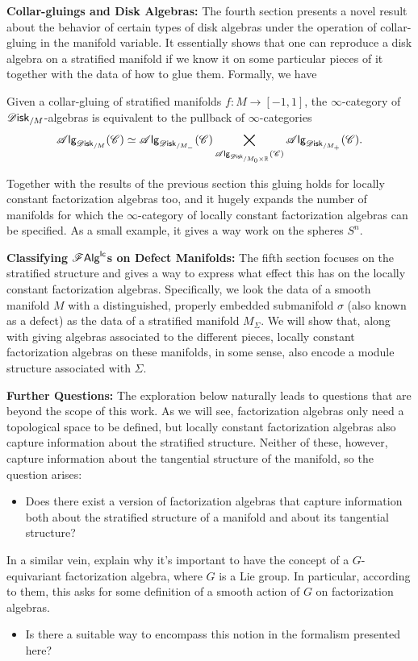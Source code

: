 \documentclass[../text]{subfiles}
\begin{document}
\textbf{ Collar-gluings and Disk Algebras:} The fourth section presents a novel result about the behavior of certain types of disk algebras under the operation of collar-gluing in the manifold variable. It essentially shows that one can reproduce a disk algebra on a stratified manifold if we know it on some particular pieces of it together with the data of how to glue them. Formally, we have
%
\begin{theorem}
    Given a collar-gluing of stratified manifolds $f: M \rightarrow [-1,1]$, the $\infty$-category of $\disk_{/M}$-algebras is equivalent to the pullback of $\infty$-categories
    \begin{equation}
        \alg{\disk_{/M}} (\catC) \simeq \alg{\disk_{/M_-}} (\catC) \bigtimes_{\alg{\disk_{/M_0 \times \mathbb{R}}} (\catC)} \alg{\disk_{/M_+}} (\catC).
    \end{equation}
\end{theorem}
%
Together with the results of the previous section this gluing holds for locally constant factorization algebras too, and it hugely expands the number of manifolds for which the $\infty$-category of locally constant factorization algebras can be specified. As a small example, it gives a way work on the spheres $S^n$.

\textbf{ Classifying $\mathscr{F} \mathsf{Alg}^{\mathsf{lc}}$s on Defect Manifolds:} The fifth section focuses on the stratified structure and gives a way to express what effect this has on the locally constant factorization algebras. Specifically, we look the data of a smooth manifold $M$ with a distinguished, properly embedded submanifold $\sigma$ (also known as a defect) as the data of a stratified manifold $M_\Sigma$. We will show that, along with giving algebras associated to the different pieces, locally constant factorization algebras on these manifolds, in some sense, also encode a module structure associated with $\Sigma$.

\textbf{Further Questions:} The exploration below naturally leads to questions that are beyond the scope of this work. As we will see, factorization algebras only need a topological space to be defined, but locally constant factorization algebras also capture information about the stratified structure. Neither of these, however, capture information about the tangential structure of the manifold, so the question arises:
%
\begin{itemize}
    \item Does there exist a version of factorization algebras that capture information both about the stratified structure of a manifold and about its tangential structure?
\end{itemize}
%
In a similar vein, \cite{cg2016} explain why it's important to have the concept of a $G$-equivariant factorization algebra, where $G$ is a Lie group. In particular, according to them, this asks for some definition of a smooth action of $G$ on factorization algebras.
%
\begin{itemize}
    \item Is there a suitable way to encompass this notion in the formalism presented here?
\end{itemize}
\end{document}
